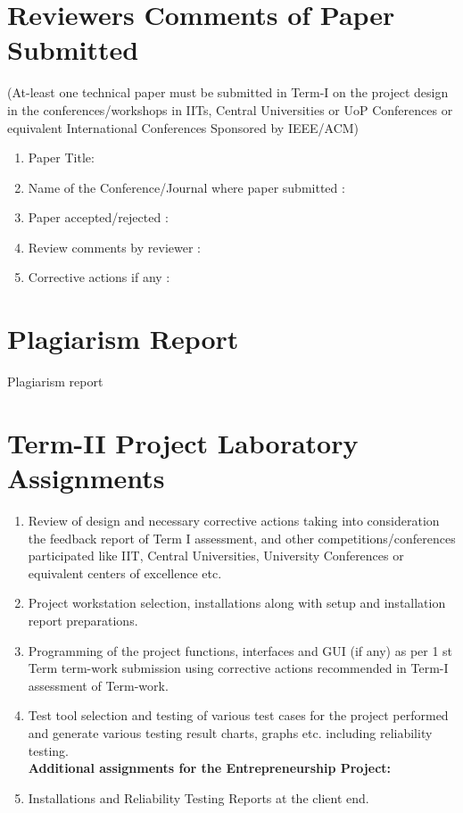 \documentclass[twoside,a4paper,12pt]{book}
\begin{document}
\begin{appendices}
\chapter{Reviewers Comments of Paper Submitted}
(At-least one technical paper must be submitted in Term-I on the project design in the
conferences/workshops in IITs, Central Universities or UoP Conferences or equivalent International Conferences Sponsored by IEEE/ACM)
\begin{enumerate}
\item Paper Title:
\item Name of the Conference/Journal where paper submitted :
\item Paper accepted/rejected : 
\item Review comments by reviewer :
\item Corrective actions if any :  

\end{enumerate}

\chapter{Plagiarism Report}
Plagiarism report
\chapter{ Term-II Project Laboratory Assignments}
\begin{enumerate}
\item Review of design and necessary corrective actions taking into consideration the feedback report of Term I assessment, and other competitions/conferences participated like IIT, Central Universities, University Conferences or equivalent centers of excellence etc.
\item Project workstation selection, installations along with setup and installation report preparations.
\item Programming of the project functions, interfaces and GUI (if any) as per 1 st Term term-work submission using corrective actions recommended in Term-I assessment of Term-work.
\item Test tool selection and testing of various test cases for the project performed and generate various testing result charts, graphs etc. including reliability testing.\\
\textbf{Additional assignments for the Entrepreneurship Project:}
\item Installations and Reliability Testing Reports at the client end.

\end{enumerate}
\end{appendices}
\end{document}

